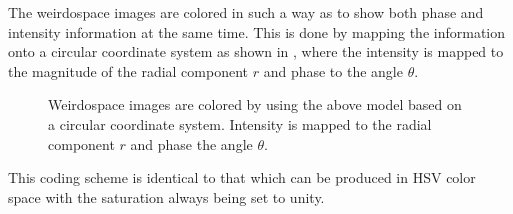 The weirdospace images are colored in such a way as to show both phase and
intensity information at the same time.  This is done by mapping the
information onto a circular coordinate system as shown in , where the intensity is mapped to the magnitude of the radial
component $r$ and phase to the angle $\theta$.
\begin{figure}[ht]
  \centering
  \caption{Weirdospace images are colored by using the above model based on a
    circular coordinate system.  Intensity is mapped to the radial component
    $r$ and phase the angle $\theta$.}
  \label{fig:hsv}
\end{figure}
This coding scheme is identical to that which can be produced in HSV color
space with the saturation always being set to unity.

